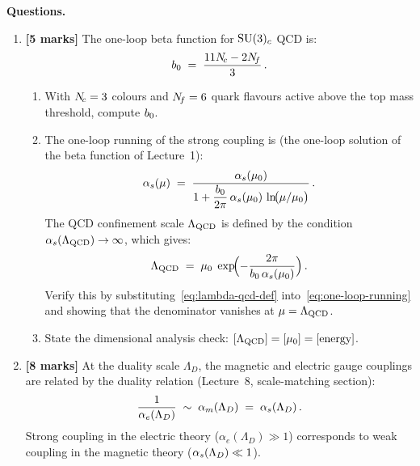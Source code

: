 \documentclass[11pt,a4paper]{article}
\begin{document}
\noindent\textbf{Questions.}
\begin{enumerate}[label=(\alph*)]

  \item \textbf{[5 marks]}
    The one-loop beta function for $\mathrm{SU}(3)_c$ QCD is:
    \begin{equation}\label{eq:beta-coeff}
      b_0 \;=\; \frac{11N_{\!c} - 2N_{\!f}}{3}\,.
    \end{equation}
    \begin{enumerate}[label=(\roman*)]
      \item With $N_{\!c} = 3$ colours and $N_{\!f} = 6$ quark flavours active
        above the top mass threshold, compute $b_0$.

      \item The one-loop running of the strong coupling is
        (the one-loop solution of the beta function of Lecture~1):
        \begin{equation}\label{eq:one-loop-running}
          \alphas(\mu)
          \;=\; \frac{\alphas(\mu_0)}{%
            1 + \dfrac{\bzero}{2\pi}\,
            \alphas(\mu_0)\,
            \ln\!\bigl(\mu / \mu_0\bigr)}\,.
        \end{equation}
        The QCD confinement scale $\Lambda_{\mathrm{QCD}}$ is defined by the
        condition $\alpha_s(\Lambda_{\mathrm{QCD}}) \to \infty$, which gives:
        \begin{equation}\label{eq:lambda-qcd-def}
          \Lambda_{\mathrm{QCD}}
          \;=\; \mu_0 \;\exp\!\Bigl(
            -\frac{2\pi}{b_0\,\alpha_s(\mu_0)}
          \Bigr)\,.
        \end{equation}
        Verify this by substituting~\eqref{eq:lambda-qcd-def}
        into~\eqref{eq:one-loop-running} and showing that the
        denominator vanishes at $\mu = \Lambda_{\mathrm{QCD}}$.

      \item State the dimensional analysis check:
        $[\Lambda_{\mathrm{QCD}}] = [\mu_0] = [\text{energy}]$.
    \end{enumerate}

  \item \textbf{[8 marks]}
    At the duality scale $\Lambda_D$, the magnetic and electric gauge
    couplings are related by the duality relation
    (Lecture~8, scale-matching section):
    \begin{equation}\label{eq:duality-coupling}
      \frac{1}{\alpha_e(\Lambda_D)}
      \;\sim\; \alpha_m(\Lambda_D)
      \;=\; \alpha_s(\Lambda_D)\,.
    \end{equation}
    Strong coupling in the electric theory
    ($\alpha_e(\Lambda_D) \gg 1$) corresponds to weak coupling in the
    magnetic theory ($\alpha_s(\Lambda_D) \ll 1$).


\end{enumerate}
\end{document}
